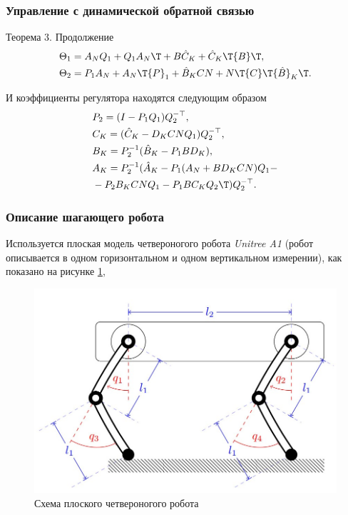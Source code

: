 \begin{frame}
	\frametitle{Управление с динамической обратной связью}
	\begin{block}{Теорема 3. Продолжение}
	\begin{align*}
		&{\Theta}_1 = {A}_N{Q}_{1} +{Q}_{1}{A}_N\T + {B}{\hat{C}}_K +{\hat{C}}_K\T{B}\T, \\
		&{\Theta}_2 = {P}_{1}{A}_N +{A}_N\T{P}_{1}+{\hat{B}}_K{C}{N}+{N}\T{C}\T{\hat{B}}_K\T.
	\end{align*}
	
	И коэффициенты регулятора находятся следующим образом 
	\begin{align*}
		&{P}_{2} = ({I}-{P}_{1}{Q}_{1}){Q}_{2}^{-\top},\\
		&{C}_K = ({\hat{C}}_K - {D}_K {C} {N} {Q}_{1} ){Q}_{2}^{-\top},\\
		&{B}_K = {P}_{2}^{-1}({\hat{B}}_K- {P}_{1}{B}{D}_K),\\
		&{A}_K = {P}_{2}^{-1}({\hat{A}}_K-{P}_{1}({A}_N+{B}{D}_K{C}{N}){Q}_{1} -\\ 
		& - {P}_{2}{B}_K{C}{N}{Q}_{1}-{P}_{1} {B}{C}_K{Q}_{2}\T){Q}_{2}^{-\top}.
	\end{align*}
\end{block}
\end{frame}

\begin{frame}
	\frametitle{Описание шагающего робота}
	Используется плоская модель четвероногого робота \textit{Unitree A1} (робот описывается в одном горизонтальном и одном вертикальном измерении), как показано на рисунке \ref{fig:flat_robot},
	\begin{figure}
		\centering
		\includegraphics[width=0.7\linewidth]{images/FlatQuadruped.jpeg}
		\caption{Схема плоского четвероногого робота}
		\label{fig:flat_robot}
	\end{figure}
\end{frame}

